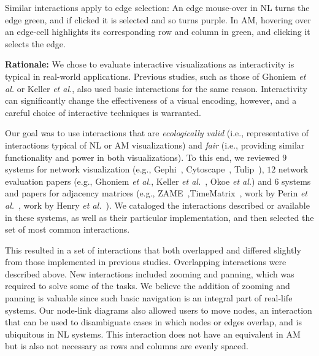 Similar interactions apply to edge selection: An edge mouse-over in NL turns the edge green, and if clicked it is selected and so turns purple. In AM, hovering over an edge-cell highlights its corresponding row and column in green, and clicking it selects the edge.

\vspace{2mm}
\noindent
\textbf{Rationale:} We chose to evaluate interactive visualizations as interactivity is typical in real-world applications. Previous studies, such as those of Ghoniem {\it et al.} or Keller {\it et al.}, also used basic interactions for the same reason. Interactivity can significantly change the effectiveness of a visual encoding, however, and a careful choice of interactive techniques is warranted. 

Our goal was to use interactions that are {\it ecologically valid} (i.e., representative of interactions typical of NL or AM visualizations) and {\it fair} (i.e., providing similar functionality and power in both visualizations). To this end, we reviewed $9$ systems for network visualization (e.g., Gephi~\cite{bastian2009gephi}, Cytoscape~\cite{shannon2003cytoscape}, Tulip~\cite{auber2004tulip}), $12$ network evaluation papers (e.g., Ghoniem {\it et al.}\cite{ghoniem2004comparison}, Keller {\it et al.}~\cite{keller2006matrices}, Okoe {\it et al.}\cite{okoeecological}) 
and $6$ systems and papers for adjacency matrices (e.g., ZAME~\cite{elmqvist2008zame},TimeMatrix~\cite{yi2010timematrix}, work by Perin {\it et al.}~\cite{perin2014revisiting}, work by Henry {\it et al.}~\cite{henry2006matrixexplorer}). We cataloged the interactions described or available in these systems, as well as their particular implementation, and then selected the set of most common interactions.

This resulted in a set of interactions that both overlapped and differed slightly from those implemented in previous studies. Overlapping interactions were described above. New interactions included zooming and panning, which was required to solve some of the tasks. %
We believe the addition of zooming and panning is valuable since such basic navigation is an integral part of real-life systems. Our node-link diagrams also allowed users to move nodes, an interaction that can be used to disambiguate cases in which nodes or edges overlap, and is ubiquitous in NL systems. This interaction does not have an equivalent in AM but is also not necessary as rows and columns are evenly spaced.

